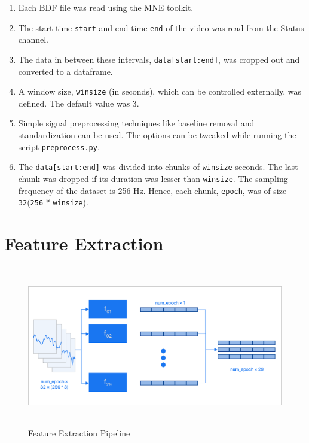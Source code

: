 \begin{enumerate}
\item Each BDF file was read using the MNE toolkit.
\item The start time \texttt{start} and end time \texttt{end} of the video was read from the Status channel.
\item The data in between these intervals, \texttt{data[start:end]}, was cropped out and converted to a dataframe.
\item A window size, \texttt{winsize} (in seconds), which can be controlled externally, was defined. The default value was 3.
\item Simple signal preprocessing techniques like baseline removal and standardization can be used. The options can be tweaked while running the script \texttt{preprocess.py}.
\item The \texttt{data[start:end]} was divided into chunks of \texttt{winsize} seconds. The last chunk was dropped if its duration was lesser than \texttt{winsize}. The sampling frequency of the dataset is 256 Hz. Hence, each chunk, \texttt{epoch}, was of size \texttt{32}\times(\texttt{256} * \texttt{winsize}).
\end{enumerate}

\section{Feature Extraction}

\begin{figure}[H]
\centering
\includegraphics[height=7cm]{Figures/feat_extract.png}
\caption{Feature Extraction Pipeline}
\label{fig23}
\end{figure}

